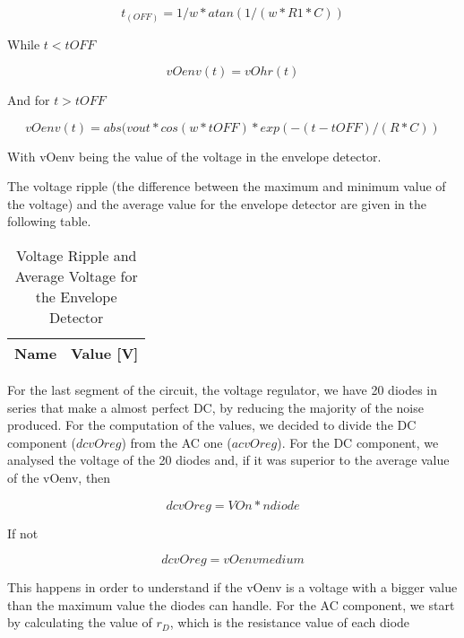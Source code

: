 \begin{equation}
t_(OFF) = 1/w * atan(1/(w*R1*C))
\label{eq:1.1}
\end{equation}

While $t<tOFF$

\begin{equation}
vOenv (t) = vOhr (t)
\label{eq:1.2}
\end{equation}

And for $t>tOFF$

\begin{equation}
vOenv (t) = abs(vout*cos(w*tOFF)*exp(-(t-tOFF)/(R*C))
\label{eq:1.3}
\end{equation}

With vOenv being the value of the voltage in the envelope detector.

The voltage ripple (the difference between the maximum and minimum value of the voltage) and the average value for the envelope detector are given in the following table.

\begin{table}[H]
  \centering
  \begin{tabular}{|l|r|}
    \hline    
    {\bf Name} & {\bf Value [V]} \\ \hline
    
  \end{tabular}
  \caption{Voltage Ripple and Average Voltage for the Envelope Detector}
  \label{tab:mat3}
\end{table}



For the last segment of the circuit, the voltage regulator, we have 20 diodes in series that make a almost perfect DC, by reducing the majority of the noise produced. For the computation of the values, we decided to divide the DC component ($dcvOreg$) from the AC one ($acvOreg$).
For the DC component, we analysed the voltage of the 20 diodes and, if it was superior to the average value of the vOenv, then

\begin{equation}
dcvOreg = VOn*ndiode
\label{eq:1.4}
\end{equation}

If not

\begin{equation}
dcvOreg = vOenvmedium
\label{eq:1.5}
\end{equation}

This happens in order to understand if the vOenv is a voltage with a bigger value than the maximum value the diodes can handle.
For the AC component, we start by calculating the value of $r_D$, which is the resistance value of each diode

